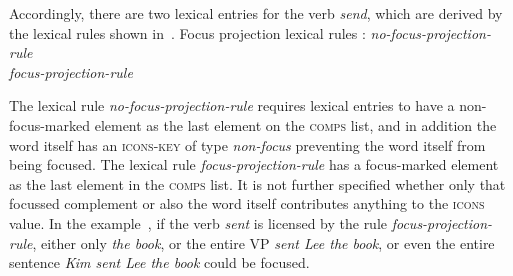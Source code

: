 \documentclass[output=paper
	        ,collection
	        ,collectionchapter
 	        ,biblatex
                ,babelshorthands
                ,newtxmath
                ,draftmode
                ,colorlinks, citecolor=brown
]{langscibook}
\begin{document}
Accordingly, there are two lexical entries for the verb \textit{send},
which are derived by the lexical rules shown
in~.
\ea
\label{ex:song-focus-projection}
Focus projection lexical rules \citep[227]{song2018}:
\ea
\emph{no-focus-projection-rule} \impl \\
\ex
\emph{focus-projection-rule} \impl \\
\z
\z

The lexical rule \textit{no-focus-projection-rule} requires lexical
entries to have a non-focus-marked element as the last element on the
\textsc{comps} list, and in addition the word itself has an
\textsc{icons-key} of type \textit{non-focus} preventing the word
itself from being focused. The lexical rule \textit{focus-projection-rule}
has a focus-marked element as the last element in the \textsc{comps}
list. It is not further specified whether only that focussed
complement or also the word itself contributes anything to the
\textsc{icons} value. In the example~,
if the verb \textit{sent} is licensed by the rule
\textit{focus-projection-rule}, either only \textit{the book},
or the entire VP \textit{sent Lee the book}, or even the
entire sentence \textit{Kim sent Lee the book} could be focused.
\end{document}
